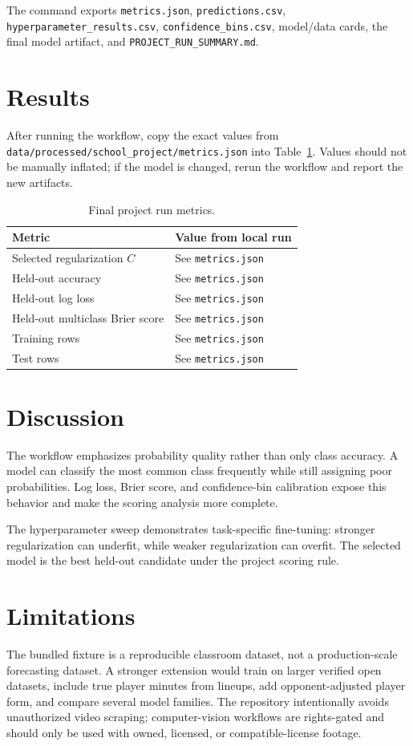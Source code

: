 \documentclass[11pt]{article}
\begin{document}
The command exports \texttt{metrics.json}, \texttt{predictions.csv}, \texttt{hyperparameter\_results.csv}, \texttt{confidence\_bins.csv}, model/data cards, the final model artifact, and \texttt{PROJECT\_RUN\_SUMMARY.md}.

\section{Results}
After running the workflow, copy the exact values from \texttt{data/processed/school\_project/metrics.json} into Table~\ref{tab:results}. Values should not be manually inflated; if the model is changed, rerun the workflow and report the new artifacts.

\begin{table}[h]
\centering
\begin{tabular}{ll}
\toprule
Metric & Value from local run \\
\midrule
Selected regularization $C$ & See \texttt{metrics.json} \\
Held-out accuracy & See \texttt{metrics.json} \\
Held-out log loss & See \texttt{metrics.json} \\
Held-out multiclass Brier score & See \texttt{metrics.json} \\
Training rows & See \texttt{metrics.json} \\
Test rows & See \texttt{metrics.json} \\
\bottomrule
\end{tabular}
\caption{Final project run metrics.}
\label{tab:results}
\end{table}

\section{Discussion}
The workflow emphasizes probability quality rather than only class accuracy. A model can classify the most common class frequently while still assigning poor probabilities. Log loss, Brier score, and confidence-bin calibration expose this behavior and make the scoring analysis more complete.

The hyperparameter sweep demonstrates task-specific fine-tuning: stronger regularization can underfit, while weaker regularization can overfit. The selected model is the best held-out candidate under the project scoring rule.

\section{Limitations}
The bundled fixture is a reproducible classroom dataset, not a production-scale forecasting dataset. A stronger extension would train on larger verified open datasets, include true player minutes from lineups, add opponent-adjusted player form, and compare several model families. The repository intentionally avoids unauthorized video scraping; computer-vision workflows are rights-gated and should only be used with owned, licensed, or compatible-license footage.
\end{document}
